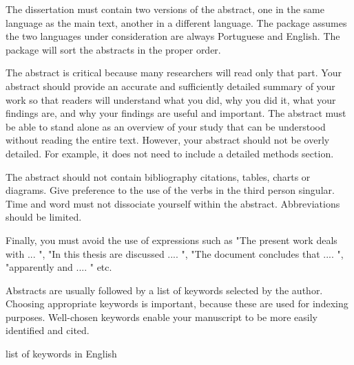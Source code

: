 \abstractEN %

The dissertation must contain two versions of the abstract, one in the same language as the main text, another in a different language.  The package assumes the two languages under consideration are always Portuguese and English. The package will sort the abstracts in the proper order. 

The abstract is critical because many researchers will read only that part. Your abstract should provide an accurate and sufficiently detailed summary of your work so that readers will understand what you did, why you did it, what your findings are, and why your findings are useful and important. The abstract must be able to stand alone as an overview of your study that can be understood without reading the entire text. However, your abstract should not be overly detailed. For example, it does not need to include a detailed methods section.

The abstract should not contain bibliography citations, tables, charts or diagrams. Give preference to the use of the verbs in the third person singular. Time and word must not dissociate yourself within the abstract. Abbreviations should be limited. 

Finally, you must avoid the use of expressions such as "The present work deals with ... ", "In this thesis are discussed .... ", "The document concludes that .... ", "apparently and .... " etc.

Abstracts are usually followed by a list of keywords selected by the author. Choosing appropriate keywords is important, because these are used for indexing purposes. Well-chosen keywords enable your manuscript to be more easily identified and cited. 

\begin{keywords}
list of keywords in English
\end{keywords} 
